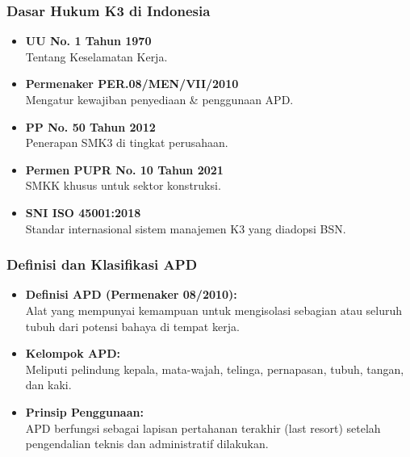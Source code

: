 \documentclass[../main.tex]{subfiles}
\begin{document}
\begin{frame}[t, mytitle=standard]
	\frametitle{Dasar Hukum K3 di Indonesia}
	\begin{itemize}
		\item \textbf{UU No. 1 Tahun 1970} \\ Tentang Keselamatan Kerja.
		\item \textbf{Permenaker PER.08/MEN/VII/2010} \\ Mengatur kewajiban penyediaan \& penggunaan APD.
		\item \textbf{PP No. 50 Tahun 2012} \\ Penerapan SMK3 di tingkat perusahaan.
		\item \textbf{Permen PUPR No. 10 Tahun 2021} \\ SMKK khusus untuk sektor konstruksi.
		\item \textbf{SNI ISO 45001:2018} \\ Standar internasional sistem manajemen K3 yang diadopsi BSN.
	\end{itemize}
\end{frame}

\begin{frame}[c, mytitle=imageplus]
	\frametitle{Definisi dan Klasifikasi APD}
	\begin{itemize}
		\item \textbf{Definisi APD (Permenaker 08/2010):} \\ Alat yang mempunyai kemampuan untuk mengisolasi sebagian atau seluruh tubuh dari potensi bahaya di tempat kerja.
		\item \textbf{Kelompok APD:} \\ Meliputi pelindung kepala, mata-wajah, telinga, pernapasan, tubuh, tangan, dan kaki.
		\item \textbf{Prinsip Penggunaan:} \\ APD berfungsi sebagai lapisan pertahanan terakhir (last resort) setelah pengendalian teknis dan administratif dilakukan.
	\end{itemize}
\end{frame}
\end{document}
